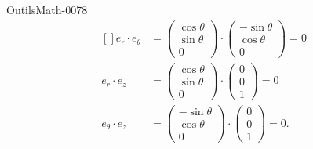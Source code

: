 \begin{corrige}{OutilsMath-0078}
    \begin{equation}
        \begin{aligned}[]
            e_r\cdot e_{\theta}&=\begin{pmatrix}
                \cos\theta    \\ 
                \sin\theta    \\ 
                0    
            \end{pmatrix}\cdot\begin{pmatrix}
                -\sin\theta    \\ 
                \cos\theta    \\ 
                0    
            \end{pmatrix}=0\\
            e_r\cdot e_z&=\begin{pmatrix}
                \cos\theta    \\ 
                \sin\theta    \\ 
                0    
            \end{pmatrix}\cdot\begin{pmatrix}
                0    \\ 
                0    \\ 
                1    
            \end{pmatrix}=0\\
            e_{\theta}\cdot e_z&=\begin{pmatrix}
                -\sin\theta    \\ 
                \cos\theta    \\ 
                0    
            \end{pmatrix}\cdot\begin{pmatrix}
                0    \\ 
                0    \\ 
                1    
            \end{pmatrix}=0.
        \end{aligned}
    \end{equation}

\end{corrige}
